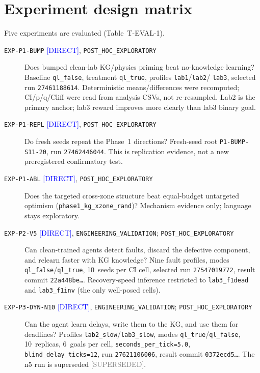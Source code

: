 \documentclass[12pt, a4paper, oneside]{memoir}
\newcommand{\evDirect}{\textcolor{blue}{[DIRECT]}}
\newcommand{\evSuperseded}{\textcolor{gray}{[SUPERSEDED]}}
\newcommand{\rsPHE}{\texttt{POST\_HOC\_EXPLORATORY}}
\newcommand{\rsEV}{\texttt{ENGINEERING\_VALIDATION}}
\newcommand{\qlT}{\texttt{ql\_true}}
\newcommand{\qlF}{\texttt{ql\_false}}
\begin{document}
\section{Experiment design matrix}
\label{sec:eval-design}

Five experiments are evaluated (Table~T-EVAL-1).

\begin{description}
  \item[\texttt{EXP-P1-BUMP} \evDirect, \rsPHE]
    Does bumped clean-lab KG/physics priming beat no-knowledge learning?
    Baseline \qlF, treatment \qlT, profiles \texttt{lab1}/\texttt{lab2}/%
    \texttt{lab3}, selected run \texttt{27461188614}.  Deterministic
    means/differences were recomputed; CI/p/q/Cliff were read from analysis
    CSVs, not re-resampled.  Lab2 is the primary anchor; lab3 reward improves
    more clearly than lab3 binary goal.

  \item[\texttt{EXP-P1-REPL} \evDirect, \rsPHE]
    Do fresh seeds repeat the Phase~1 directions?  Fresh-seed root
    \texttt{P1-BUMP-S11-20}, run \texttt{27462446044}.  This is replication
    evidence, not a new preregistered confirmatory test.

  \item[\texttt{EXP-P1-ABL} \evDirect, \rsPHE]
    Does the targeted cross-zone structure beat equal-budget untargeted
    optimism (\texttt{phase1\_kg\_xzone\_rand})?  Mechanism evidence only;
    language stays exploratory.

  \item[\texttt{EXP-P2-V5} \evDirect, \rsEV; \rsPHE]
    Can clean-trained agents detect faults, discard the defective component,
    and relearn faster with KG knowledge?  Nine fault profiles, modes
    \qlF/\qlT, 10~seeds per CI cell, selected run \texttt{27547019772},
    result commit \texttt{22a448be\ldots}.  Recovery-speed inference
    restricted to \texttt{lab3\_f1dead} and \texttt{lab3\_f1inv} (the only
    well-posed cells).

  \item[\texttt{EXP-P3-DYN-N10} \evDirect, \rsEV; \rsPHE]
    Can the agent learn delays, write them to the KG, and use them for
    deadlines?  Profiles \texttt{lab2\_slow}/\texttt{lab3\_slow}, modes
    \qlT/\qlF, 10~replicas, 6~goals per cell,
    \texttt{seconds\_per\_tick=5.0}, \texttt{blind\_delay\_ticks=12}, run
    \texttt{27621106006}, result commit \texttt{0372ecd5\ldots}.  The n5 run
    is superseded \evSuperseded.
\end{description}
\end{document}

